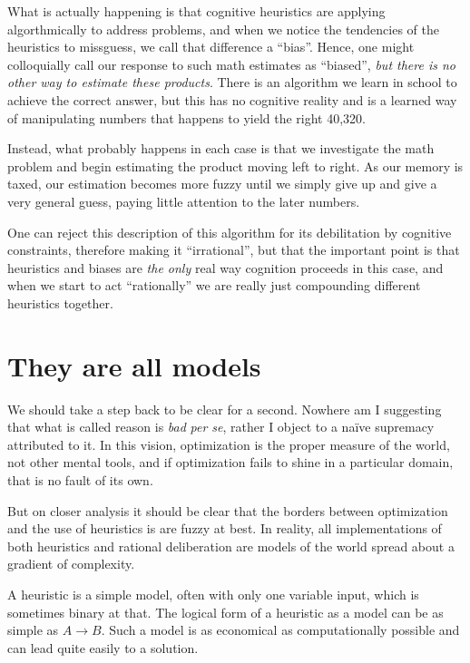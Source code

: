 \documentclass{article}
\begin{document}
What is actually happening is that cognitive heuristics are applying algorthmically to address problems, and when we notice the tendencies of the heuristics to missguess, we call that difference a ``bias''.
Hence, one might colloquially call our response to such math estimates as ``biased'', \emph{but there is no other way to estimate these products}.
There is an algorithm we learn in school to achieve the correct answer, but this has no cognitive reality and is a learned way of manipulating numbers that happens to yield the right 40,320.

Instead, what probably happens in each case is that we investigate the math problem and begin estimating the product moving left to right.
As our memory is taxed, our estimation becomes more fuzzy until we simply give up and give a very general guess, paying little attention to the later numbers.

One can reject this description of this algorithm for its debilitation by cognitive constraints, therefore making it ``irrational'', but that the important point is that heuristics and biases are \emph{the only} real way cognition proceeds in this case, and when we start to act ``rationally'' we are really just compounding different heuristics together.

\section{They are all models\label{models}}

We should take a step back to be clear for a second.
Nowhere am I suggesting that what is called reason is \emph{bad} \textit{per se}, rather I object to a na{\"i}ve supremacy attributed to it.
In this vision, optimization is the proper measure of the world, not other mental tools, and if optimization fails to shine in a particular domain, that is no fault of its own.

But on closer analysis it should be clear that the borders between optimization and the use of heuristics is are fuzzy at best.
In reality, all implementations of both heuristics and rational deliberation are models of the world spread about a gradient of complexity.

A heuristic is a simple model, often with only one variable input, which is sometimes binary at that.
The logical form of a heuristic as a model can be as simple as $A{\rightarrow}B$.
Such a model is as economical as computationally possible and can lead quite easily to a solution.
\end{document}
